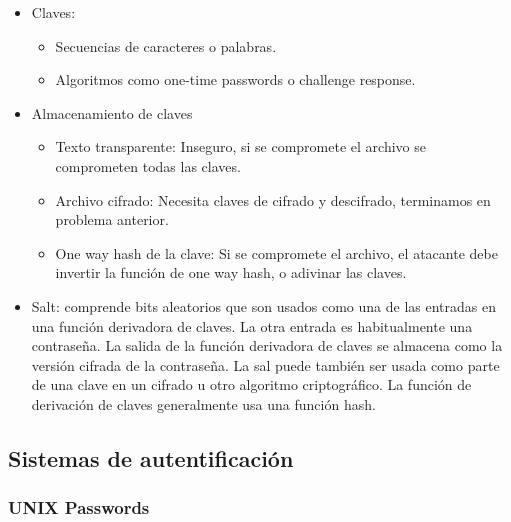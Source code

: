 \begin{itemize}
\begin{itemize}
		\item Claves: \begin{itemize}
			\item Secuencias de caracteres o palabras.
			\item Algoritmos como one-time passwords o challenge response.
		\end{itemize}
		\item Almacenamiento de claves \begin{itemize}
			\item Texto transparente: Inseguro, si se compromete el archivo se comprometen todas las claves.
			\item Archivo cifrado: Necesita claves de cifrado y descifrado, terminamos en problema anterior.
			\item One way hash de la clave: Si se compromete el archivo, el atacante debe invertir la función
			de one way hash, o adivinar las claves.
		\end{itemize}
		\item Salt: comprende bits aleatorios que  son usados como una de las entradas en una función derivadora de claves. 
			La otra entrada es habitualmente una contraseña. La salida de la función derivadora de  claves se almacena como 
			la versión cifrada de la contraseña. La sal puede también ser usada como parte de una clave en un cifrado u otro 
			algoritmo criptográfico. La función de derivación de claves generalmente usa una función hash.
	\end{itemize}
\end{itemize}

\subsection{Sistemas de autentificación}

\subsubsection{UNIX Passwords}

